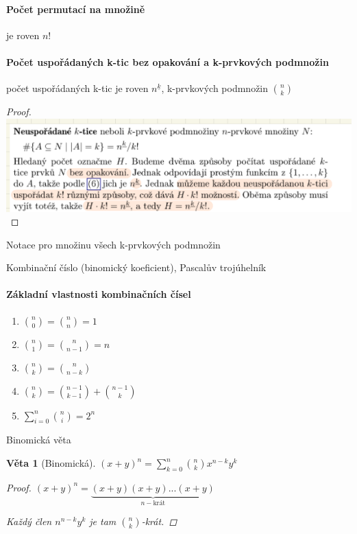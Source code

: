 \documentclass[10pt,a4paper]{article}
\theoremstyle{plain}
\newtheorem{veta}{Věta}
\theoremstyle{definition}
\begin{document}
\paragraph{Počet permutací na množině} je roven $n!$

\paragraph{Počet uspořádaných k-tic bez opakování a k-prvkových podmnožin} počet uspořádaných k-tic je roven $n^{\underline{k}}$, k-prvkových podmnožin $\binom{n}{k}$

\begin{proof}
\includegraphics[scale=1]{binom.png} 
\end{proof}

Notace pro množinu všech k-prvkových podmnožin

Kombinační číslo (binomický koeficient), Pascalův trojúhelník

\paragraph{Základní vlastnosti kombinačních čísel} \begin{enumerate}
\item $\binom{n}{0} = \binom{n}{n} = 1$
\item $\binom{n}{1} = \binom{n}{n-1} = n$
\item $\binom{n}{k} = \binom{n}{n-k}$
\item $\binom{n}{k} = \binom{n-1}{k-1} + \binom{n-1}{k}$
\item $\displaystyle \sum_{i=0}^n \binom{n}{i} = 2^n$
\end{enumerate}

Binomická věta
\begin{veta}[Binomická]
$(x+y)^n = \displaystyle \sum^n_{k=0} \binom{n}{k} x^{n-k}y^k$
\begin{proof}
$(x+y)^n =\underbrace{(x+y)(x+y)...(x+y)}_{n-\text{krát}}$

Každý člen $n^{n-k}y^k$ je tam $\binom{n}{k}$-krát.
\end{proof}
\end{veta}
\end{document}
